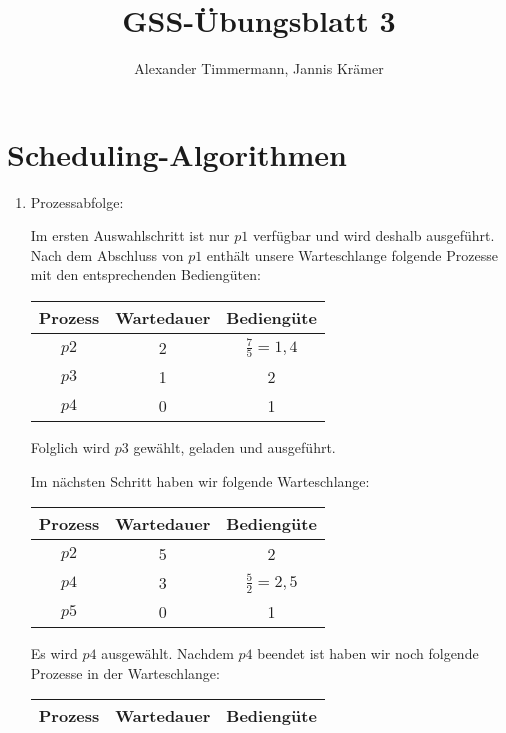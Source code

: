 \documentclass[a4paper,11pt,ngerman]{scrartcl}
\author{Alexander Timmermann, Jannis Krämer}
\title{GSS-Übungsblatt 3}
\date{}
\begin{document}
\maketitle
\thispagestyle{empty}

\doublespace

\section{Scheduling-Algorithmen}

\begin{enumerate}[\bf a)]
    \item Prozessabfolge:\\
        \begin{figure}[h]
            \scalebox{0.56}{}
        \end{figure}

        Im ersten Auswahlschritt ist nur $p1$ verfügbar und wird deshalb
        ausgeführt. Nach dem Abschluss von $p1$ enthält unsere Warteschlange
        folgende Prozesse mit den entsprechenden Bediengüten:

        \begin{tabular}{c|c|c}
            \textbf{Prozess} & \textbf{Wartedauer} & \textbf{Bediengüte}\\
            \hline

            $p2$ & 2 & $\frac{7}{5} = 1,4$\\
            $p3$ & 1 & 2\\
            $p4$ & 0 & 1
        \end{tabular}

        Folglich wird $p3$ gewählt, geladen und ausgeführt.

        Im nächsten Schritt haben wir folgende Warteschlange:

        \begin{tabular}{c|c|c}
            \textbf{Prozess} & \textbf{Wartedauer} & \textbf{Bediengüte}\\
            \hline

            $p2$ & 5 & 2\\
            $p4$ & 3 & $\frac{5}{2} = 2,5$\\
            $p5$ & 0 & 1
        \end{tabular}

        Es wird $p4$ ausgewählt. Nachdem $p4$ beendet ist haben wir noch folgende
        Prozesse in der Warteschlange:

        \begin{tabular}{c|c|c}
            \textbf{Prozess} & \textbf{Wartedauer} & \textbf{Bediengüte}\\
            \hline


\end{tabular}
\end{enumerate}
\end{document}
